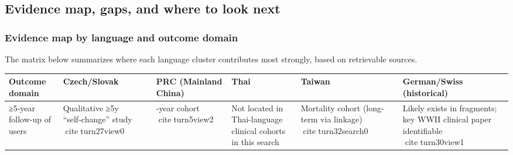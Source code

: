 \subsection{Evidence map, gaps, and where to look next}\label{13_non_english-evidence-map-gaps-and-where-to-look-next}

\subsubsection{Evidence map by language and outcome domain}\label{13_non_english-evidence-map-by-language-and-outcome-domain}

The matrix below summarizes where each language cluster contributes most strongly, based on retrievable sources.

{\def\LTcaptype{none} %
\begin{longtable}[]{@{}
  >{\raggedright\arraybackslash}p{}
  >{\raggedright\arraybackslash}p{}
  >{\raggedright\arraybackslash}p{}
  >{\raggedright\arraybackslash}p{}
  >{\raggedright\arraybackslash}p{}
  >{\raggedright\arraybackslash}p{}@{}}
\toprule\noalign{}
\begin{minipage}[b]{\linewidth}\raggedright
Outcome domain
\end{minipage} & \begin{minipage}[b]{\linewidth}\raggedright
Czech/Slovak
\end{minipage} & \begin{minipage}[b]{\linewidth}\raggedright
PRC (Mainland China)
\end{minipage} & \begin{minipage}[b]{\linewidth}\raggedright
Thai
\end{minipage} & \begin{minipage}[b]{\linewidth}\raggedright
Taiwan
\end{minipage} & \begin{minipage}[b]{\linewidth}\raggedright
German/Swiss (historical)
\end{minipage} \\
\midrule\noalign{}
\endhead
\bottomrule\noalign{}
\endlastfoot
≥5‑year follow-up of users & Qualitative ≥5y ``self‑change'' study citeturn27view0 & 8‑year cohort citeturn5view2 & Not located in Thai-language clinical cohorts in this search & Mortality cohort (long-term via linkage) citeturn32search0 & Likely exists in fragments; key WWII clinical paper identifiable citeturn30view1 \\

\end{longtable}}
